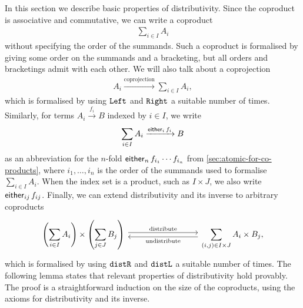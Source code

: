 In this section we describe basic properties of distributivity. Since the coproduct is associative and commutative, we can write a coproduct 
\begin{align*}
    \sum_{i \in I} A_i
\end{align*}
without specifying the order of the summands. Such a coproduct is formalised by giving some order on the summands and a bracketing, but all orders and bracketings admit  with each other. We will also talk about a coprojection
\begin{align*}
A_i 
\xrightarrow {\text{coprojection}}
\sum_{i \in I} A_i,
\end{align*}
which is formalised by using $\mathtt{Left}$ and $\mathtt{Right}$ a suitable number of times. Similarly, for terms $A_i \xrightarrow{f_i} B$ indexed by $i \in I$, we write
\begin{align*}
\sum_{i \in I} A_i \xrightarrow{\mathsf{either}_{i}\, f_i} B
\end{align*}
as an abbreviation for the $n$-fold  $\mathsf{either}_{n}\, f_{i_1} \cdots f_{i_n}$ from \cref{sec:atomic-for-co-products}, where $i_1, \ldots, i_n$ is the order of the summands used to formalise $\sum_{i \in I} A_i$. When the index set is a product, such as $I \times J$, we also write $\mathsf{either}_{ij}\, f_{ij}$. Finally, we can extend distributivity and its inverse to arbitrary coproducts
    \[
\begin{tikzcd}
    [column sep=3cm]
\displaystyle{\left(\sum_{i \in I} A_i \right) \times \left(\sum_{j \in J} B_j \right) }
\ar[r,shift left=0.6ex,"\text{distribute}"]
&
\displaystyle{\sum_{(i,j) \in I \times J} A_i \times B_j}
\ar[l,shift left=0.6ex,"\text{undistribute}"],
\end{tikzcd}
\]
which is formalised by using $\mathtt{distR}$ and $\mathtt{distL}$ a suitable number of times. The following lemma states that relevant properties of distributivity hold provably. The proof is a straightforward induction on the size of the coproducts, using the axioms for distributivity and its inverse.

